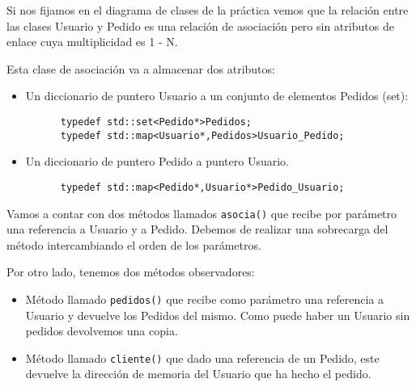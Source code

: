 Si nos fijamos en el diagrama de clases de la práctica vemos que la relación entre las clases Usuario y Pedido es una relación de asociación pero sin atributos de enlace cuya multiplicidad es 1 - N.

Esta clase de asociación va a almacenar dos atributos:
\begin{itemize}
  \item Un diccionario de puntero Usuario a un conjunto de elementos Pedidos (set):
  \begin{center}
    \begin{verbatim}
      typedef std::set<Pedido*>Pedidos;
      typedef std::map<Usuario*,Pedidos>Usuario_Pedido;
    \end{verbatim}
  \end{center}
  \item Un diccionario de puntero Pedido a puntero Usuario.
  \begin{center}
    \begin{verbatim}
      typedef std::map<Pedido*,Usuario*>Pedido_Usuario;
    \end{verbatim}
  \end{center}
\end{itemize}

Vamos a contar con dos métodos llamados \texttt{asocia()} que recibe por parámetro una referencia a Usuario y a Pedido. Debemos de realizar una sobrecarga del método intercambiando el orden de los parámetros.

Por otro lado, tenemos dos métodos observadores:
\begin{itemize}
  \item Método llamado \texttt{pedidos()} que recibe como parámetro una referencia a Usuario y devuelve los Pedidos del mismo. Como puede haber un Usuario sin pedidos devolvemos una copia.
  \item Método llamado \texttt{cliente()} que dado una referencia de un Pedido, este devuelve la dirección de memoria del Usuario que ha hecho el pedido.
\end{itemize}

